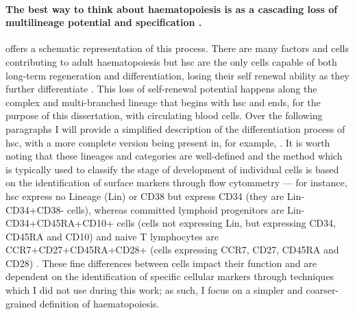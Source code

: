 \paragraph{The best way to think about haematopoiesis is as a cascading loss of multilineage potential and specification \cite{Rieger2012-bh}.}  offers a schematic representation of this process. There are many factors and cells contributing to adult haematopoiesis but \ac{hsc} are the only cells capable of both long-term regeneration and differentiation, losing their self renewal ability as they further differentiate \cite{Rieger2012-bh,Benveniste2010-au}. This loss of self-renewal potential happens along the complex and multi-branched lineage that begins with \ac{hsc} and ends, for the purpose of this dissertation, with circulating blood cells. Over the following paragraphs I will provide a simplified description of the differentiation process of \ac{hsc}, with a more complete version being present in, for example, \cite{Rieger2012-bh}. It is worth noting that these lineages and categories are well-defined and the method which is typically used to classify the stage of development of individual cells is based on the identification of surface markers through flow cytommetry \cite{Spangrude1988-xs,Ng2017-cp} --- for instance, \ac{hsc} express no Lineage (Lin) or CD38 but express CD34 (they are Lin-CD34+CD38- cells), whereas committed lymphoid progenitors are Lin-CD34+CD45RA+CD10+ cells (cells not expressing Lin, but expressing CD34, CD45RA and CD10) and naive T lymphocytes are CCR7+CD27+CD45RA+CD28+ (cells expressing CCR7, CD27, CD45RA and CD28) \cite{Miller1999-en,Appay2008-sk}. These fine differences between cells impact their function and are dependent on the identification of specific cellular markers through techniques which I did not use during this work; as such, I focus on a simpler and coarser-grained definition of haematopoiesis.

\begin{figure}
    \label{fig:haema}
  \end{figure}
